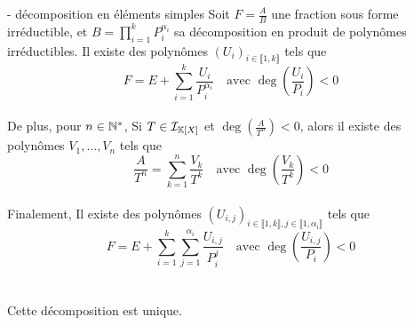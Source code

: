     \begin{theoreme}{17.34}{ - décomposition en éléments simples}
        Soit $F = \frac{A}{B}$ une fraction sous forme irréductible, et $B = \prod_{i=1}^{k}P_i^{\alpha_i}$ sa décomposition en produit de polynômes irréductibles. Il existe des polynômes $(U_{i})_{i \in \llbracket 1,k \rrbracket}$ tels que $$F = E + \sum_{i=1}^{k}\frac{U_{i}}{P_i^{\alpha_i}} \quad \text{avec $\deg(\frac{U_{i}}{P_i})<0$} $$ \\
        De plus, pour $n \in \mathbb{N}^*$, Si $T \in \mathcal{I}_{\mathbb{K}[X]} $ et $\deg(\frac{A}{T^n})<0$, alors il existe des polynômes $V_1,\dots,V_n$ tels que $$\frac{A}{T^n} = \sum_{k=1}^{n}\frac{V_k}{T^k} \quad \text{avec $\deg(\frac{V_k}{T^k})<0$}$$ \\
        Finalement, Il existe des polynômes $(U_{i,j})_{i \in \llbracket 1,k \rrbracket, j \in \llbracket 1,\alpha_i \rrbracket}$ tels que $$F = E + \sum_{i=1}^{k}\sum_{j=1}^{\alpha_i}\frac{U_{i,j}}{P_i^j} \quad \text{avec $\deg(\frac{U_{i,j}}{P_i})<0$} $$ \\ \\
        Cette décomposition est unique.
    \end{theoreme}
